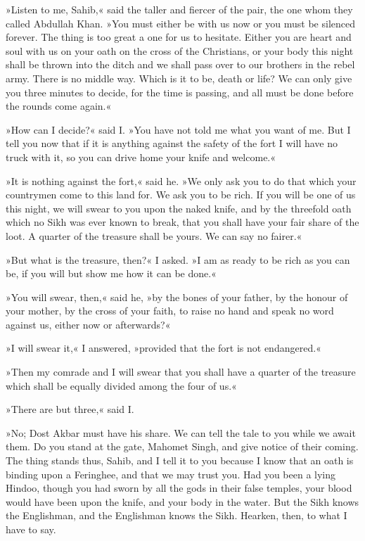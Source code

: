 »Listen to me, Sahib,« said the taller and fiercer of the pair, the one whom they called Abdullah Khan. »You must either be with us now or you must be silenced forever. The thing is too great a one for us to hesitate. Either you are heart and soul with us on your oath on the cross of the Christians, or your body this night shall be thrown into the ditch and we shall pass over to our brothers in the rebel army. There is no middle way. Which is it to be, death or life? We can only give you three minutes to decide, for the time is passing, and all must be done before the rounds come again.«

»How can I decide?« said I. »You have not told me what you want of me. But I tell you now that if it is anything against the safety of the fort I will have no truck with it, so you can drive home your knife and welcome.«

»It is nothing against the fort,« said he. »We only ask you to do that which your countrymen come to this land for. We ask you to be rich. If you will be one of us this night, we will swear to you upon the naked knife, and by the threefold oath which no Sikh was ever known to break, that you shall have your fair share of the loot. A quarter of the treasure shall be yours. We can say no fairer.«

»But what is the treasure, then?« I asked. »I am as ready to be rich as you can be, if you will but show me how it can be done.«

»You will swear, then,« said he, »by the bones of your father, by the honour of your mother, by the cross of your faith, to raise no hand and speak no word against us, either now or afterwards?«

»I will swear it,« I answered, »provided that the fort is not endangered.«

»Then my comrade and I will swear that you shall have a quarter of the treasure which shall be equally divided among the four of us.«

»There are but three,« said I.

»No; Dost Akbar must have his share. We can tell the tale to you while we await them. Do you stand at the gate, Mahomet Singh, and give notice of their coming. The thing stands thus, Sahib, and I tell it to you because I know that an oath is binding upon a Feringhee, and that we may trust you. Had you been a lying Hindoo, though you had sworn by all the gods in their false temples, your blood would have been upon the knife, and your body in the water. But the Sikh knows the Englishman, and the Englishman knows the Sikh. Hearken, then, to what I have to say.


